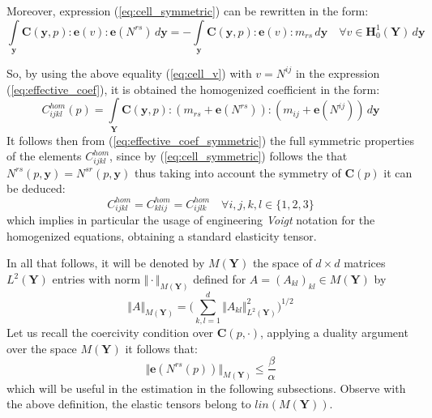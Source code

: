 Moreover, expression (\ref{eq:cell_symmetric}) can be rewritten in the form:
\begin{equation}
    \label{eq:cell_v}
    \int\limits_{\mathbf{y}}\mathbf{C}(\mathbf{y},p):\mathbf{e}(v): \mathbf{e}(N^{rs}) \, d\mathbf{y} = - \int\limits_{\mathbf{y}} \mathbf{C}(\mathbf{y},p):\mathbf{e}(v):m_{rs}\, d\mathbf{y} \quad \forall v \in \mathbf{H}^1_{0}(\mathbf{Y}) \, d\mathbf{y}
\end{equation}

So, by using the above equality (\ref{eq:cell_v}) with $v = N^{ij}$ in the expression (\ref{eq:effective_coef}), it is obtained the homogenized coefficient in the form:
\begin{equation}
    \label{eq:effective_coef_symmetric}
    C_{ijkl}^{hom}(p) = \int\limits_{\mathbf{Y}} \mathbf{C}(\mathbf{y},p):(m_{rs}+\mathbf{e}(N^{rs})):(m_{ij}+\mathbf{e}(N^{ij})) \, d\mathbf{y}
\end{equation}
It follows then from (\ref{eq:effective_coef_symmetric}) the full symmetric properties of the elements $C^{hom}_{ijkl}$, since by (\ref{eq:cell_symmetric}) follows the that $N^{rs}(p,\mathbf{y}) = N^{sr}(p, \mathbf{y})$ thus taking into account the symmetry of $\mathbf{C}(p)$ it can be deduced:
\begin{equation*}
    C^{hom}_{ijkl} = C^{hom}_{klij} = C^{hom}_{ijlk} \quad \forall i,j,k,l \in \{1,2,3\}
\end{equation*}
which implies in particular the usage of engineering \textit{Voigt} notation for the homogenized equations, obtaining a standard elasticity tensor.

In all that follows, it will be denoted by $M(\mathbf{Y})$ the space of $d \times d$ matrices $L^2(\mathbf{Y})$ entries with norm $\Vert \cdot \Vert_{M(\mathbf{Y})}$ defined for $A = (A_{kl})_{kl} \in M(\mathbf{Y})$ by
\begin{equation}
    \Vert A \Vert_{M(\mathbf{Y})} = \big(\sum_{k,l=1}^d \Vert A_{kl} \Vert^2_{L^2(\mathbf{Y})} \big)^{1/2}
\end{equation}
Let us recall the coercivity condition over $\mathbf{C}(p, \cdot)$, applying a duality argument over the space $M(\mathbf{Y})$ it follows that:
\begin{equation}
    \label{eq:Estimate-Nrs}
    \Vert \mathbf{e}(N^{rs}(p))\Vert_{M(\mathbf{Y})} \leq \frac{\beta}{\alpha}
\end{equation}
which will be useful in the estimation in the following subsections. Observe with the above definition, the elastic tensors belong to $lin(M(\mathbf{Y}))$.
